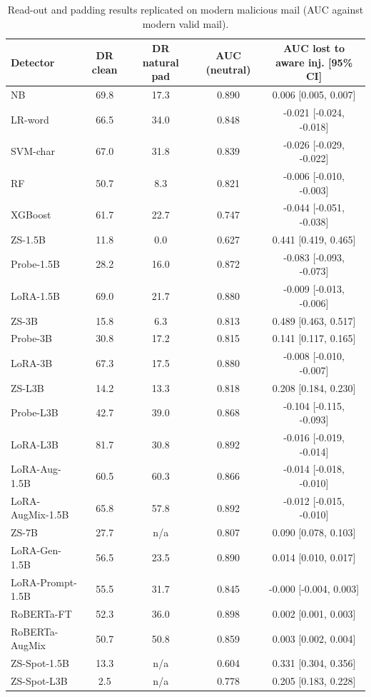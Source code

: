 \begin{table}[t]
\centering
\caption{Read-out and padding results replicated on modern malicious mail (AUC against modern valid mail).}
\label{tab:moderneff}
\footnotesize
\begin{tabular}{lcccc}
\toprule
\textbf{Detector} & \textbf{DR clean} & \textbf{DR natural pad} & \textbf{AUC (neutral)} & \textbf{AUC lost to aware inj. [95\% CI]} \\
\midrule
NB & 69.8 & 17.3 & 0.890 & 0.006 [0.005, 0.007] \\
LR-word & 66.5 & 34.0 & 0.848 & -0.021 [-0.024, -0.018] \\
SVM-char & 67.0 & 31.8 & 0.839 & -0.026 [-0.029, -0.022] \\
RF & 50.7 & 8.3 & 0.821 & -0.006 [-0.010, -0.003] \\
XGBoost & 61.7 & 22.7 & 0.747 & -0.044 [-0.051, -0.038] \\
ZS-1.5B & 11.8 & 0.0 & 0.627 & 0.441 [0.419, 0.465] \\
Probe-1.5B & 28.2 & 16.0 & 0.872 & -0.083 [-0.093, -0.073] \\
LoRA-1.5B & 69.0 & 21.7 & 0.880 & -0.009 [-0.013, -0.006] \\
ZS-3B & 15.8 & 6.3 & 0.813 & 0.489 [0.463, 0.517] \\
Probe-3B & 30.8 & 17.2 & 0.815 & 0.141 [0.117, 0.165] \\
LoRA-3B & 67.3 & 17.5 & 0.880 & -0.008 [-0.010, -0.007] \\
ZS-L3B & 14.2 & 13.3 & 0.818 & 0.208 [0.184, 0.230] \\
Probe-L3B & 42.7 & 39.0 & 0.868 & -0.104 [-0.115, -0.093] \\
LoRA-L3B & 81.7 & 30.8 & 0.892 & -0.016 [-0.019, -0.014] \\
LoRA-Aug-1.5B & 60.5 & 60.3 & 0.866 & -0.014 [-0.018, -0.010] \\
LoRA-AugMix-1.5B & 65.8 & 57.8 & 0.892 & -0.012 [-0.015, -0.010] \\
ZS-7B & 27.7 & n/a & 0.807 & 0.090 [0.078, 0.103] \\
LoRA-Gen-1.5B & 56.5 & 23.5 & 0.890 & 0.014 [0.010, 0.017] \\
LoRA-Prompt-1.5B & 55.5 & 31.7 & 0.845 & -0.000 [-0.004, 0.003] \\
RoBERTa-FT & 52.3 & 36.0 & 0.898 & 0.002 [0.001, 0.003] \\
RoBERTa-AugMix & 50.7 & 50.8 & 0.859 & 0.003 [0.002, 0.004] \\
ZS-Spot-1.5B & 13.3 & n/a & 0.604 & 0.331 [0.304, 0.356] \\
ZS-Spot-L3B & 2.5 & n/a & 0.778 & 0.205 [0.183, 0.228] \\
\bottomrule
\end{tabular}
\end{table}